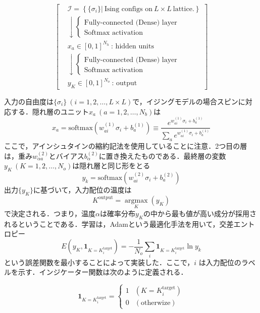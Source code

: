 \documentclass[a4paper,11pt]{jsarticle}
\begin{document}
\begin{equation}
  \left[
    \begin{aligned}
       & \mathcal{I} = \left\{ \{ \sigma_i \} \Big| \ \text{Ising configs on} \ L \times L \ \text{lattice.} \right\} \\
       & \downarrow
      \begin{cases}
        \text{Fully-connected (Dense) layer} \\
        \text{Softmax activation}
      \end{cases}                                                                            \\
       & x_a \in [0,1]^{N_h} \ \text{: hidden units}                                                                  \\
       & \downarrow
      \begin{cases}
        \text{Fully-connected (Dense) layer} \\
        \text{Softmax activation}
      \end{cases}                                                                            \\
       & y_K \in [0,1]^{N_o} \ \text{: output}
    \end{aligned}
    \right]
\end{equation}

入力の自由度は$\{ \sigma_i \} \ (i=1,2,\dots,L \times L)$で，イジングモデルの場合スピンに対応する．隠れ層のユニット$x_a \ (a=1,2,\dots,N_b)$は
\begin{equation}
  x_a = \text{softmax}(w_{ai}^{(1)}\sigma_i + b_a^{(1)})
  \equiv \frac{e^{w_{ai}^{(1)}\sigma_i + b_a^{(1)}}}{\sum_a e^{w_{ai}^{(1)}\sigma_i + b_a^{(1)}}}
\end{equation}
ここで，アインシュタインの縮約記法を使用していることに注意．2つ目の層は，重み$w_{\alpha a}^{(2)}$とバイアス$b_{\alpha}^{(2)}$に置き換えたものである．最終層の変数$y_K \ (K=1,2,\dots,N_o)$は隠れ層と同じ形をとる
\begin{equation}
  y_k = \text{softmax}(w_{ai}^{(2)}\sigma_i + b_a^{(2)})
\end{equation}
出力$\{ y_K \}$に基づいて，入力配位の温度は
\begin{equation}
  K^{\text{output}} = \underset{K} {\operatorname{argmax}} (y_K)
\end{equation}
で決定される．つまり，温度$\alpha$は確率分布$y_K$の中から最も値が高い成分が採用されるということである．学習は，Adamという最適化手法を用いて，交差エントロピー
\begin{equation}
  E(y_K,\bm{1}_{K=K_i^{\text{target}}}) = - \frac{1}{N_o}\sum_i \bm{1}_{K=K_i^{\text{target}}} \ln{y_k}
\end{equation}
という誤差関数を最小することによって実装した．ここで，$i$ は入力配位のラベルを示す．インジケーター関数は次のように定義される．\par
\begin{equation}
  \bm{1}_{K=K_i^{\text{target}}} =
  \begin{cases}
    1 & (K=K_i^{\text{target}}) \\
    0 & (\text{otherwize})
  \end{cases}
\end{equation}
\end{document}
